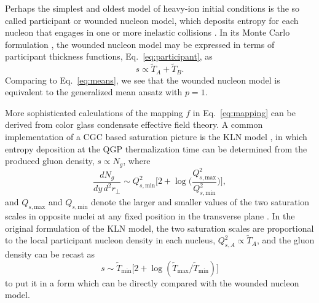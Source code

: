 \documentclass[aps,prc,reprint,amsmath,nofootinbib]{revtex4-1}
\newcommand{\T}{\tilde{T}}
\newcommand{\Qs}[1]{Q_{s,\text{#1}}}
\begin{document}
Perhaps the simplest and oldest model of heavy-ion initial conditions is the so called participant or wounded nucleon model, which deposits entropy for each nucleon that engages in one or more inelastic collisions \cite{Bialas:1976ed}.
In its Monte Carlo formulation \cite{Shor:1988vk, Wang:1991hta, Alver:2008aq, Broniowski:2007nz}, the wounded nucleon model may be expressed in terms of participant thickness functions, Eq.~\eqref{eq:participant}, as
\begin{equation}
  s \propto \T_A + \T_B.
  \label{eq:wn}
\end{equation}
Comparing to Eq.~\eqref{eq:means}, we see that the wounded nucleon model is equivalent to the generalized mean ansatz with $p=1$.

More sophisticated calculations of the mapping $f$ in Eq.~\eqref{eq:mapping} can be derived from color glass condensate effective field theory.
A common implementation of a CGC based saturation picture is the KLN model \cite{Kharzeev:2001yq, Kharzeev:2002ei, Kharzeev:2004if}, in which entropy deposition at the QGP thermalization time can be determined from the produced gluon density, $s \propto N_g$, where
\begin{equation}
  \frac{dN_g}{dy\,d^2r_\perp} \sim \Qs{min}^2 \biggl[
    2 + \log \biggl(\frac{\Qs{max}^2}{\Qs{min}^2} \biggr)
  \biggr],
  \label{eq:kln}
\end{equation}
and $\Qs{max}$ and $\Qs{min}$ denote the larger and smaller values of the two saturation scales in opposite nuclei at any fixed position in the transverse plane \cite{Drescher:2006ca}.
In the original formulation of the KLN model, the two saturation scales are proportional to the local participant nucleon density in each nucleus, $Q^2_{s,A} \propto \T_A$, and the gluon density can be recast as
\begin{equation}
  s \sim \T_\text{min} \bigl[ 2 + \log(\T_\text{max}/\T_\text{min}) \bigr]
\end{equation}
to put it in a form which can be directly compared with the wounded nucleon model.
\end{document}

